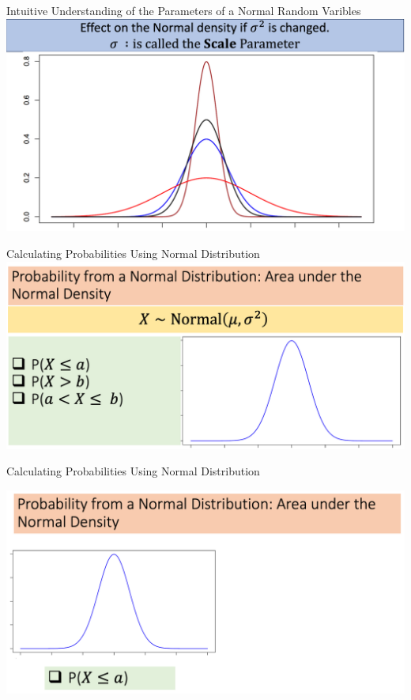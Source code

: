 \documentclass[compress]{beamer}
\begin{document}
\begin{frame}{Intuitive Understanding of the Parameters of a Normal Random Varibles }
\vspace{-.15in}
\includegraphics[scale=.25]{figs/Normal_SD_interpret.png}

\end{frame}



\begin{frame}{Calculating Probabilities Using Normal Distribution}
\vspace{-.1in}
\includegraphics[scale=.35]{figs/Normal_1.png}
\vspace{1in}
\end{frame}

\begin{frame}{Calculating Probabilities Using Normal  Distribution}

\includegraphics[scale=.4]{figs/Normal_2.png}
\vspace{1in}
\end{frame}
\end{document}

